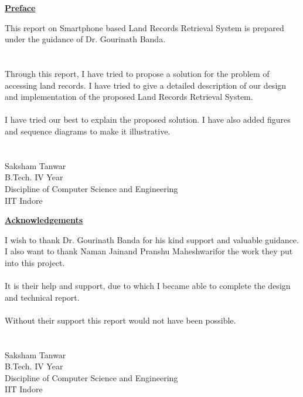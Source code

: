 \documentclass[12pt]{article}
\newcommand{\mainauth}{Saksham Tanwar}
\newcommand{\conta}{Naman Jain}
\newcommand{\contb}{Pranshu Maheshwari}
\begin{document}

{
    \begin{center}
        \textbf{\underline{\large{Preface}}}
    \end{center}
    This report on Smartphone based Land Records Retrieval System is prepared under the guidance of Dr. Gourinath Banda.\\
    \\
    \\
    Through this report, I have tried to propose a solution for the problem of accessing land records. I have tried to give a detailed description of our design and implementation of the proposed Land Records Retrieval System.\\
    \\
    I have tried our best to explain the proposed solution. I have also added figures and sequence diagrams to make it illustrative.\\
    \\
    \\
    \mainauth\\
    B.Tech. IV Year\\
    Discipline of Computer Science and Engineering\\
    IIT Indore 


    \thispagestyle{empty}
}

\clearpage


{
    \begin{center}
        \textbf{\underline{\large{Acknowledgements}}}
    \end{center}
    I wish to thank Dr. Gourinath Banda for his kind support and valuable guidance. I also want to thank \conta\space and \contb\space for the work they put into this project.\\
    \\
    It is their help and support, due to which I became able to complete the design and technical report.\\
    \\
    Without their support this report would not have been possible.\\
    \\
    \\
    \mainauth\\
    B.Tech. IV Year\\
    Discipline of Computer Science and Engineering\\
    IIT Indore 
    \thispagestyle{empty}
}
\end{document}
